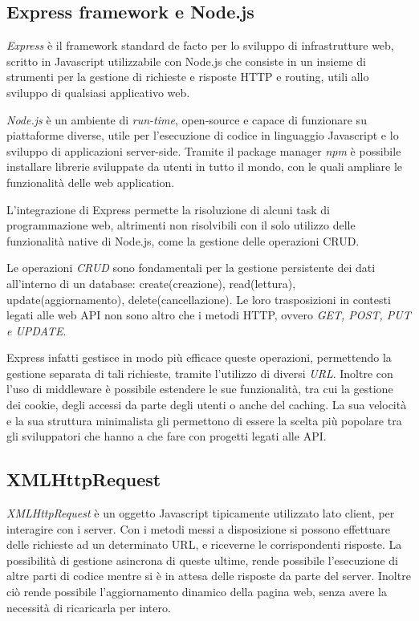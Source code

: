 \subsection{Express framework e Node.js}
\emph{Express} \cite{ex-express} è il framework standard de facto per lo sviluppo di infrastrutture web, scritto in Javascript utilizzabile con Node.js che consiste in un insieme di strumenti per la gestione di richieste e risposte HTTP e routing, utili allo sviluppo di qualsiasi applicativo web. 

\emph{Node.js} \cite{mdn-express} è un ambiente di \textit{run-time}, open-source e capace di funzionare su piattaforme diverse, utile per l'esecuzione di codice in linguaggio Javascript e lo sviluppo di applicazioni server-side. Tramite il package manager \emph{npm} è possibile installare librerie sviluppate da utenti in tutto il mondo, con le quali ampliare le funzionalità delle web application.

L'integrazione di Express permette la risoluzione di alcuni task di programmazione web, altrimenti non risolvibili con il solo utilizzo delle funzionalità native di Node.js, come la gestione delle operazioni CRUD.

Le operazioni \emph{CRUD} \cite{Martin1983ManagingTD} sono fondamentali per la gestione persistente dei dati all'interno di un database: create(creazione), read(lettura), update(aggiornamento), delete(cancellazione).
Le loro trasposizioni in contesti legati alle web API non sono altro che i metodi HTTP, ovvero \emph{GET, POST, PUT e UPDATE}.

Express infatti gestisce in modo più efficace queste operazioni, permettendo la gestione separata di tali richieste, tramite l'utilizzo di diversi \emph{URL}. 
Inoltre con l'uso di middleware è possibile estendere le sue funzionalità, tra cui la gestione dei cookie, degli accessi da parte degli utenti o anche del caching.
La sua velocità e la sua struttura minimalista gli permettono di essere la scelta più popolare tra gli sviluppatori che hanno a che fare con progetti legati alle API.

\thispagestyle{mystyle}
\subsection{XMLHttpRequest}
\emph{XMLHttpRequest} \cite{mdn-XMLHttpRequest} è un oggetto Javascript tipicamente utilizzato lato client, per interagire con i server. Con i metodi messi a disposizione si possono effettuare delle richieste ad un determinato URL, e riceverne le corrispondenti risposte.
La possibilità di gestione asincrona di queste ultime, rende possibile l'esecuzione di altre parti di codice mentre si è in attesa delle risposte da parte del  server.
Inoltre ciò rende possibile l'aggiornamento dinamico della pagina web, senza avere la necessità di ricaricarla per intero.

